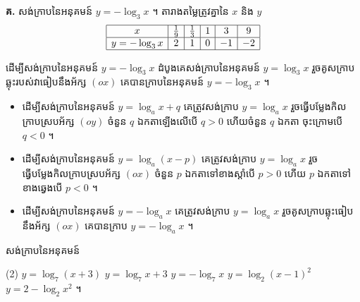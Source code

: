 \textbf{គ.} សង់ក្រាបនៃអនុគមន៍ $y = -\log_3 x$ ។ តារាងតម្លៃត្រូវគ្នានៃ $x$ និង $y$
\[
\begin{array}{|c|c|c|c|c|c|}\hline
x & \frac{1}{9} & \frac{1}{3} & 1 & 3 & 9\\ \hline
y = -\log_3 x & 2 & 1 & 0 & -1 & -2\\ \hline
\end{array}
\]
\begin{center}
\end{center}
ដើម្បីសង់ក្រាបនៃអនុគមន៍ $y = -\log_3 x$ ដំបូងគេសង់ក្រាបនៃអនុគមន៍ $y = \log_3 x$ រួចគូសក្រាបឆ្លុះរបស់វាធៀបនឹងអ័ក្ស $(ox)$ គេបានក្រាបនៃអនុគមន៍ $y = -\log_3 x$ ។

\begin{formulaBox}[ជាទូទៅ]
\begin{itemize}
  \item ដើម្បីសង់ក្រាបនៃអនុគមន៍ $y = \log_a x + q$ គេត្រូវសង់ក្រាប $y = \log_a x$ រួចធ្វើបម្លែងកិលក្រាបស្របអ័ក្ស $(oy)$ ចំនួន $q$ ឯកតាឡើងលើបើ $q > 0$ ហើយចំនួន $q$ ឯកតា ចុះក្រោមបើ $q < 0$ ។
  \item ដើម្បីសង់ក្រាបនៃអនុគមន៍ $y = \log_a(x - p)$ គេត្រូវសង់ក្រាប $y = \log_a x$ រួចធ្វើបម្លែងកិលក្រាបស្របអ័ក្ស $(ox)$ ចំនួន $p$ ឯកតាទៅខាងស្តាំបើ $p > 0$ ហើយ $p$ ឯកតាទៅខាងឆ្វេងបើ $p < 0$ ។
  \item ដើម្បីសង់ក្រាបនៃអនុគមន៍ $y = -\log_a x$ គេត្រូវសង់ក្រាប $y = \log_a x$ រួចគូសក្រាបឆ្លុះធៀបនឹងអ័ក្ស $(ox)$ គេបានក្រាប $y = -\log_a x$ ។
\end{itemize}
\end{formulaBox}

\begin{pro}
សង់ក្រាបនៃអនុគមន៍
\begin{tasks}(2)
  \task $y = \log_7(x + 3)$
  \task $y = \log_7 x + 3$
  \task $y = -\log_7 x$
  \task $y = \log_2(x - 1)^2$
  \task $y = 2 - \log_2 x^2$ ។
\end{tasks}
\end{pro}


